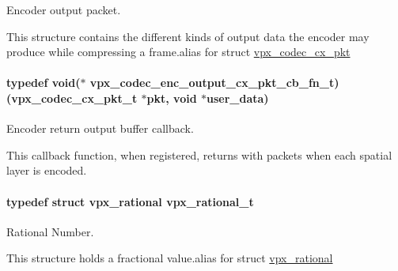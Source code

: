 Encoder output packet. 

This structure contains the different kinds of output data the encoder may produce while compressing a frame.\+alias for struct \hyperlink{structvpx__codec__cx__pkt}{vpx\+\_\+codec\+\_\+cx\+\_\+pkt} 
\paragraph[{\texorpdfstring{vpx\+\_\+codec\+\_\+enc\+\_\+output\+\_\+cx\+\_\+pkt\+\_\+cb\+\_\+fn\+\_\+t}{vpx_codec_enc_output_cx_pkt_cb_fn_t}}]{\setlength{\rightskip}{0pt plus 5cm}typedef void($\ast$ vpx\+\_\+codec\+\_\+enc\+\_\+output\+\_\+cx\+\_\+pkt\+\_\+cb\+\_\+fn\+\_\+t) ({\bf vpx\+\_\+codec\+\_\+cx\+\_\+pkt\+\_\+t} $\ast$pkt, void $\ast$user\+\_\+data)}\hypertarget{group__encoder_ga2ced5dac1f5d963a38bd4d2a05ec8bd9}{}\label{group__encoder_ga2ced5dac1f5d963a38bd4d2a05ec8bd9}


Encoder return output buffer callback. 

This callback function, when registered, returns with packets when each spatial layer is encoded. 
\paragraph[{\texorpdfstring{vpx\+\_\+rational\+\_\+t}{vpx_rational_t}}]{\setlength{\rightskip}{0pt plus 5cm}typedef struct {\bf vpx\+\_\+rational}  {\bf vpx\+\_\+rational\+\_\+t}}\hypertarget{group__encoder_ga2c08c6d71202024f17a5aef71a3d13e5}{}\label{group__encoder_ga2c08c6d71202024f17a5aef71a3d13e5}


Rational Number. 

This structure holds a fractional value.\+alias for struct \hyperlink{structvpx__rational}{vpx\+\_\+rational} 
